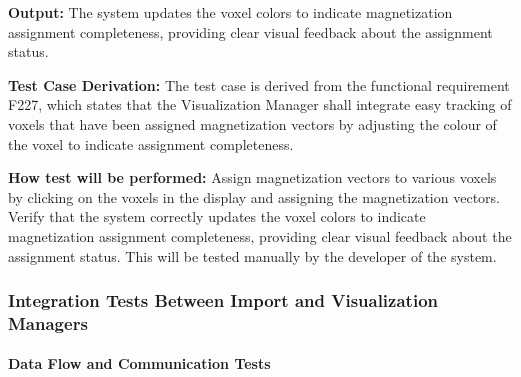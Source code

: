 \documentclass[12pt, titlepage]{article}
\begin{document}
\begin{enumerate}
\textbf{Output:} The system updates the voxel colors to indicate magnetization assignment completeness, providing clear visual feedback about the assignment status.

\textbf{Test Case Derivation:} The test case is derived from the functional requirement F227, which states that the Visualization Manager shall integrate easy tracking of voxels that have been assigned magnetization vectors by adjusting the colour of the voxel to indicate assignment completeness.
					
\textbf{How test will be performed:} Assign magnetization vectors to various voxels by clicking on the voxels in the display and assigning the magnetization vectors. Verify that the system correctly updates the voxel colors to indicate magnetization assignment completeness, providing clear visual feedback about the assignment status. This will be tested manually by the developer of the system.

\end{enumerate}

\subsubsection{Integration Tests Between Import and Visualization Managers}


\paragraph{Data Flow and Communication Tests}
\end{document}
